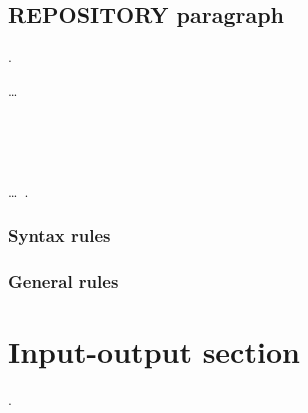 \subsection{REPOSITORY paragraph}

\begin{syntax}
  .

  \begin{0-1}
    \begin{1=}
      \begin{1=}
        \begin{1=}
          \functionname
        \end{1=}\ldots \\

      \end{1=}
       \\

       \functionname
      \begin{0-1}
         \literal
      \end{0-1} \\

       \programname
      \begin{0-1}
         \literal
      \end{0-1}
    \end{1=}\ldots\ {}.
  \end{0-1}
\end{syntax}

\subsubsection{Syntax rules}

\subsubsection{General rules}

\section{Input-output section}

\begin{syntax}
  \begin{0-1}
     .
  \end{0-1}\newline
  \begin{0-1}
  \end{0-1}\newline
  \begin{0-1}
  \end{0-1}
\end{syntax}

